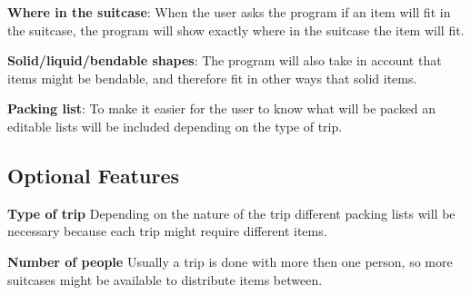\textbf{Where in the suitcase}:
When the user asks the program if an item will fit in the suitcase, the program will show exactly where in the suitcase the item will fit.
\newline

\textbf{Solid/liquid/bendable shapes}:
The program will also take in account that items might be bendable, and therefore fit in other ways that solid items. 
\newline

\textbf{Packing list}:
To make it easier for the user to know what will be packed an editable lists will be included depending on the type of trip.
\newline


\subsection{Optional Features}

\textbf{Type of trip}
Depending on the nature of the trip different packing lists will be necessary because each trip might require different items.
\newline

\textbf{Number of people}
Usually a trip is done with more then one person, so more suitcases might be available to distribute items between.
\newline